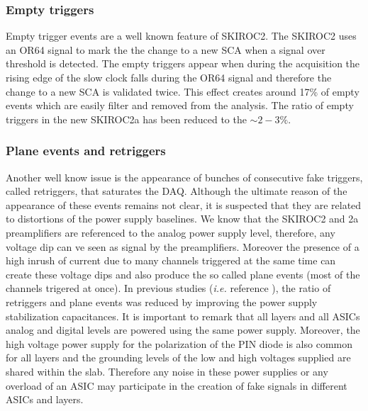 \documentclass[a4paper,11pt]{article}
\begin{document}
\subsubsection*{Empty triggers}

Empty trigger events are a well known feature of SKIROC2. The SKIROC2 uses
an OR64 signal to mark the the change to a new SCA when a signal over threshold is
detected. The empty triggers appear when during
the acquisition the rising edge of the slow clock falls during the OR64 signal
and therefore the change to a new SCA is validated twice.
This effect creates around 17\% of empty events which are easily filter and removed from the
analysis. The ratio of empty triggers in the new SKIROC2a has been reduced to the $\sim2-3\%$.

\subsubsection*{Plane events and retriggers}

Another well know issue is the appearance of bunches of consecutive fake triggers, called retriggers,
that saturates the DAQ. 
Although the ultimate reason of the appearance of these events remains not clear, it
is suspected that they are related to distortions of the
power supply baselines. We know that the SKIROC2 and 2a preamplifiers are referenced to the analog power supply level,
therefore, any voltage dip can ve seen as signal by the preamplifiers.
Moreover the presence of a high inrush of current
due to many channels triggered at the same time can create these voltage dips
and also produce the so called plane events (most of the channels trigered at once).
In previous studies ({\it i.e.} reference \cite{Amjad:2014tha}), the ratio of retriggers and plane events
was reduced by improving the power supply stabilization capacitances. It is important to remark that
all layers and all ASICs analog and digital levels are powered using the same power supply.
Moreover, the high voltage power supply for the polarization of the PIN diode is also common for all layers
and the grounding levels of the low and high voltages supplied are shared within the slab.
Therefore any noise in
these power supplies or any overload of an ASIC may participate in the creation of fake signals
in different ASICs and layers.
\end{document}
